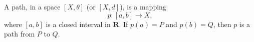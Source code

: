 A path, in a space $[X, \theta]$ (or $[X, d]$), is a mapping
$$p: [a, b] \rightarrow X,$$
where $[a, b]$ is a closed interval in $\mathbf{R}$. If $p(a) = P$ and $p(b) = Q$, then $p$ is a path from $P$ to $Q$.

